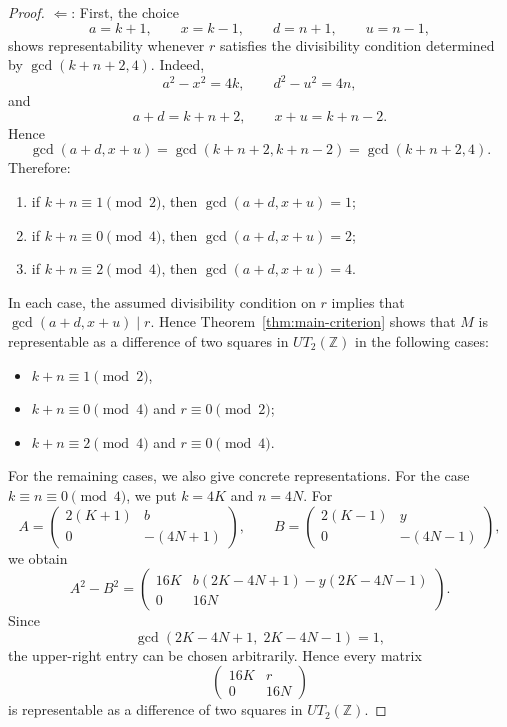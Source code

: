 \documentclass[10pt,a4paper]{amsart}
\def\Z{\mathbb{Z}}
\begin{document}
\begin{proof}  $\boxed{\Leftarrow}$:
 First, the choice
$$a=k+1,\qquad x=k-1,\qquad d=n+1,\qquad u=n-1,$$
shows representability whenever $r$ satisfies the divisibility condition determined by $\gcd(k+n+2,4)$.
Indeed,
$$a^2-x^2=4k,\qquad d^2-u^2=4n,$$
and
$$a+d=k+n+2,\qquad x+u=k+n-2.$$
Hence
$$\gcd(a+d,x+u)=\gcd(k+n+2,k+n-2)=\gcd(k+n+2,4).$$
Therefore:
\begin{enumerate}
\item[(a)] if $k+n\equiv 1 \pmod 2$, then $\gcd(a+d,x+u)=1$;
\item[(b)] if $k+n\equiv 0 \pmod 4$, then $\gcd(a+d,x+u)=2$;
\item[(c)] if $k+n\equiv 2 \pmod 4$, then $\gcd(a+d,x+u)=4$.
\end{enumerate}
In each case, the assumed divisibility condition on $r$ implies that
$\gcd(a+d,x+u)\mid r.$
Hence Theorem~\ref{thm:main-criterion} shows that $M$ is representable as a difference of two squares in $UT_2(\Z)$ in the following cases:
\begin{itemize}
   \item $k+n\equiv1\pmod 2$,
\item $k+n\equiv0\pmod 4$ and $r\equiv0\pmod 2$;
\item $k+n\equiv2\pmod 4$ and $r\equiv0\pmod 4$.
\end{itemize}

For the remaining cases, we also give concrete representations.  For the case $k\equiv n\equiv 0 \pmod 4$, we put $k=4K$ and $n=4N$. For
$$A=\begin{pmatrix}2(K+1)&b\\0&-(4N+1)\end{pmatrix},\qquad
B=\begin{pmatrix}2(K-1)&y\\0&-(4N-1)\end{pmatrix},$$
we obtain
$$A^2-B^2=\begin{pmatrix}
16K & b(2K-4N+1)-y(2K-4N-1)\\0 & 16N
\end{pmatrix}.$$
Since
$$\gcd(2K-4N+1,\;2K-4N-1)=1,$$
the upper-right entry can be chosen arbitrarily. Hence every matrix
$$\begin{pmatrix}16K&r\\0&16N\end{pmatrix}$$
is representable as a difference of two squares in $UT_2(\Z)$.



\end{proof}
\end{document}
